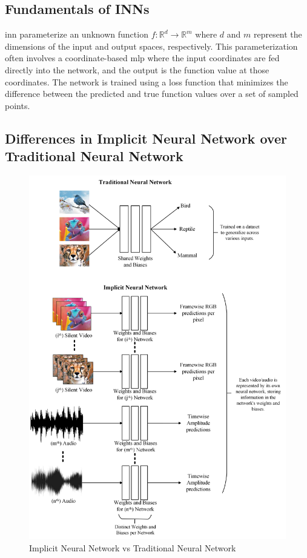 \documentclass{ioereport}
\begin{document}
    \subsection{Fundamentals of INNs}
    \gls{inn} parameterize an unknown function \( f: \mathbb{R}^d \rightarrow \mathbb{R}^m \) where \( d \) and \( m \) represent the dimensions of the input and output spaces, respectively. This parameterization often involves a coordinate-based \gls{mlp} where the input coordinates are fed directly into the network, and the output is the function value at those coordinates. The network is trained using a loss function that minimizes the difference between the predicted and true function values over a set of sampled points.

    \subsection{Differences in Implicit Neural Network over Traditional Neural Network}

    \begin{figure}[H]
        \centering
        \includegraphics[width=0.95\linewidth]{assets/why overfitting.png}
        \caption{Implicit Neural Network vs Traditional Neural Network}
        \label{fig:implicit-vs-traditional}
    \end{figure}
\end{document}
